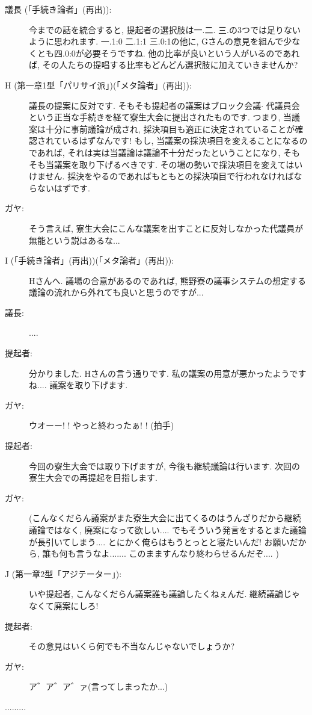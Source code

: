 \documentclass[10pt,b5jsbook,dvips,dvipdfmx,openany]{jsbook}
\theoremstyle{definition}
\begin{document}
		\begin{description}

		\item[議長 (「手続き論者」(再出)): ]今までの話を統合すると, 提起者の選択肢は一.二. 三.の3つでは足りないように思われます. 一.1:0 二.1:1 三.0:1の他に, Gさんの意見を組んで少なくとも四.0:0が必要そうですね. 他の比率が良いという人がいるのであれば, その人たちの提唱する比率もどんどん選択肢に加えていきませんか?

		\item[H (第一章1型「パリサイ派」)(「メタ論者」(再出)): ]議長の提案に反対です. そもそも提起者の議案はブロック会議$ \cdot $ 代議員会という正当な手続きを経て寮生大会に提出されたものです. つまり, 当議案は十分に事前議論が成され, 採決項目も適正に決定されていることが確認されているはずなんです! もし, 当議案の採決項目を変えることになるのであれば, それは実は当議論は議論不十分だったということになり, そもそも当議案を取り下げるべきです. その場の勢いで採決項目を変えてはいけません. 採決をやるのであればもともとの採決項目で行われなければならないはずです.

		\item[ガヤ: ]そう言えば, 寮生大会にこんな議案を出すことに反対しなかった代議員が無能という説はあるな...

		\item[I (「手続き論者」(再出))(「メタ論者」(再出)): ] Hさんへ. 議場の合意があるのであれば, 熊野寮の議事システムの想定する議論の流れから外れても良いと思うのですが...

		\item[議長: ]....

		\item[提起者: ]分かりました. Hさんの言う通りです. 私の議案の用意が悪かったようですね.... 議案を取り下げます.

		\item[ガヤ: ]ウオーー! ! やっと終わったぁ! ! (拍手)

		\item[提起者: ]今回の寮生大会では取り下げますが, 今後も継続議論は行います. 次回の寮生大会での再提起を目指します.

		\item[ガヤ: ](こんなくだらん議案がまた寮生大会に出てくるのはうんざりだから継続議論ではなく, 廃案になって欲しい.... でもそういう発言をするとまた議論が長引いてしまう.... とにかく俺らはもうとっとと寝たいんだ! お願いだから, 誰も何も言うなよ....... このまますんなり終わらせるんだぞ.... )

		\item[J (第一章2型「アジテーター」): ]いや提起者, こんなくだらん議案誰も議論したくねぇんだ. 継続議論じゃなくて廃案にしろ!

		\item[提起者: ]その意見はいくら何でも不当なんじゃないでしょうか?

		\item[ガヤ: ]ア゛ア゛ア゛ァ(言ってしまったか...)

		\end{description}
		.........
\end{document}
